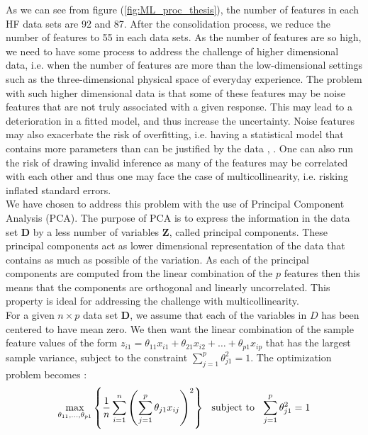 \documentclass[../thesis.tex]{subfiles}
\begin{document}
\noindent As we can see from figure (\ref{fig:ML_proc_thesis}), the number of features in each HF data sets are 92 and 87. After the consolidation process, we reduce the number of features to 55 in each data sets. As the number of features are so high, we need to have some process to address the challenge of higher dimensional data, i.e. when the number of features are more than the low-dimensional settings such as the three-dimensional physical space of everyday experience. The problem with such higher dimensional data is that some of these features may be noise features that are not truly associated with a given response. This may lead to a deterioration in a fitted model, and thus increase the uncertainty. Noise features may also exacerbate the risk of overfitting, i.e. having a statistical model that contains more parameters than can be justified by the data \citep{friedman2009elements}, \citep{james2013introduction}. One can also run the risk of drawing invalid inference as many of the features may be correlated with each other and thus one may face the case of multicollinearity, i.e. risking inflated standard errors.\\
\indent We have chosen to address this problem with the use of Principal Component Analysis (PCA). The purpose of PCA is to express the information in the data set $\mathbf{D}$ by a less number of variables $\mathbf{Z}$, called principal components. These principal components act as lower dimensional representation of the data that contains as much as possible of the variation. As each of the principal components are computed from the linear combination of the $p$ features then this means that the components are orthogonal and linearly uncorrelated. This property is ideal for addressing the challenge with multicollinearity.\\
\indent For a given $n \times p$ data set $\mathbf{D}$, we assume that each of the variables in $D$ has been centered to have mean zero. We then want the linear combination of the sample feature values of the form $z_{i1} = \theta_{11}x_{i1} + \theta_{21}x_{i2} + \hdots + \theta_{p1}x_{ip}$ that has the largest sample variance, subject to the constraint $\sum_{j = 1}^p \theta_{j1}^2 = 1$. The optimization problem becomes \citep{james2013introduction}:
\begin{align}
    \max_{\theta_{11}, \hdots, \theta_{p1}} \left\{\frac{1}{n} \sum_{i=1}^n \left(\sum_{j=1}^p \theta_{j1}x_{ij} \right)^2 \right\} \hspace{0,25cm} \text{subject to} \hspace{0,25cm} \sum_{j=1}^p\theta^2_{j1} = 1
\end{align}
\end{document}

